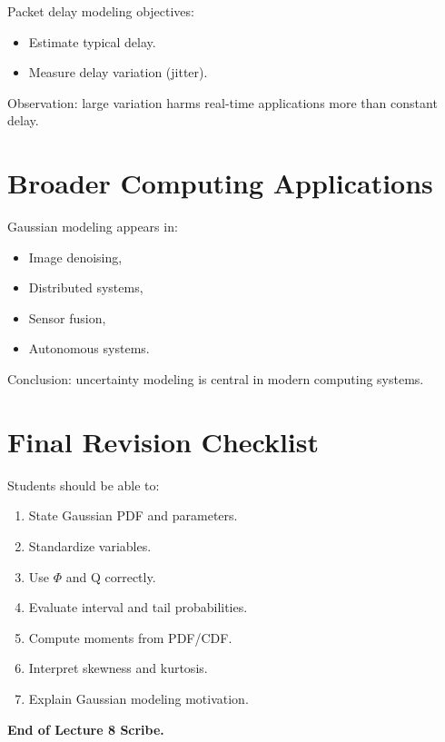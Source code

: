 \documentclass{article}
\begin{document}
Packet delay modeling objectives:
\begin{itemize}
    \item Estimate typical delay.
    \item Measure delay variation (jitter).
\end{itemize}

Observation: large variation harms real-time applications more than constant delay.

\section{Broader Computing Applications}

Gaussian modeling appears in:
\begin{itemize}
    \item Image denoising,
    \item Distributed systems,
    \item Sensor fusion,
    \item Autonomous systems.
\end{itemize}

Conclusion: uncertainty modeling is central in modern computing systems.

\section*{Final Revision Checklist}

Students should be able to:

\begin{enumerate}
    \item State Gaussian PDF and parameters.
    \item Standardize variables.
    \item Use $\Phi$ and Q correctly.
    \item Evaluate interval and tail probabilities.
    \item Compute moments from PDF/CDF.
    \item Interpret skewness and kurtosis.
    \item Explain Gaussian modeling motivation.
\end{enumerate}

\vspace{1em}
\textbf{End of Lecture 8 Scribe.}
\end{document}
